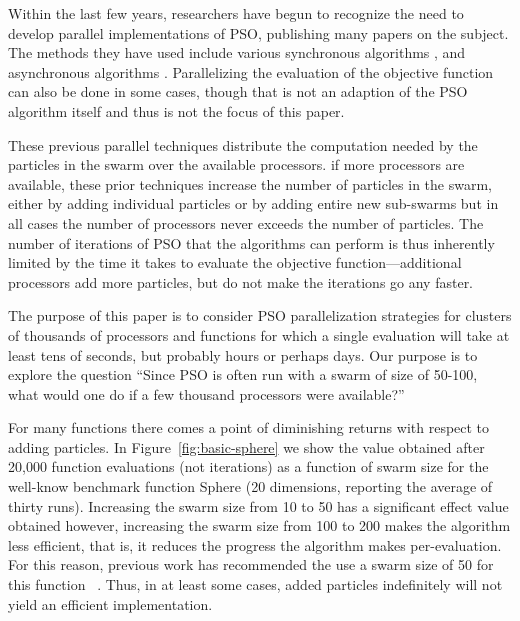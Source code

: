 \documentclass[journal,letterpaper]{IEEEtran}
\newcommand{\fig}[1]{Figure~\ref{fig:#1}}
\begin{document}
Within the last few years, researchers have begun to recognize the need to
develop parallel implementations of PSO, publishing many papers on the subject.
The methods they have used include various synchronous algorithms
\cite{mcnabb-cec07,belal-ijicis04,chu-sci06,jin-aps05,parsopoulos-aia04,schutte-ijnme04},
and asynchronous algorithms \cite{koh-ijnme06,mostaghim-report06,venter-wcsmo05}.
Parallelizing the evaluation of the objective function can also be done in some
cases, though that is not an adaption of the PSO algorithm itself and thus is
not the focus of this paper.

These previous parallel techniques 
distribute the computation needed by the particles in the swarm over the available processors.
if more processors are available, these prior techniques increase the
number of particles in the swarm, either by adding individual particles or by
adding entire new sub-swarms but in all cases
the number of processors never exceeds the number of particles.
The number of iterations of PSO that the
algorithms can perform is thus inherently limited by the time it takes to
evaluate the objective function---additional processors add more particles, but do not
make the iterations go any faster.

The purpose of this paper is to consider PSO parallelization strategies for
clusters of thousands of processors and functions for which a single
evaluation will take at least tens of seconds, but probably hours or perhaps days.
Our purpose is to explore the question ``Since PSO is often run with
a swarm of size of 50-100, what would one do if a few thousand processors were available?''

For many functions there comes a point of diminishing returns with respect to adding particles.
In \fig{basic-sphere} we show the value obtained after 20,000 function evaluations (not iterations)
as a function of swarm size
for the well-know benchmark function Sphere (20 dimensions, reporting the average of thirty runs). 
Increasing the swarm size from 10 to 50 has a significant effect value obtained
however, increasing the swarm size from 100 to 200 makes the algorithm less efficient,
that is, it reduces the progress the algorithm makes per-evaluation.
For this reason, previous work has recommended the use a swarm size of 50 for this function
~\cite{bratton-sis07}.
Thus, in at least some cases, added particles indefinitely will not yield an efficient implementation. 
\end{document}
